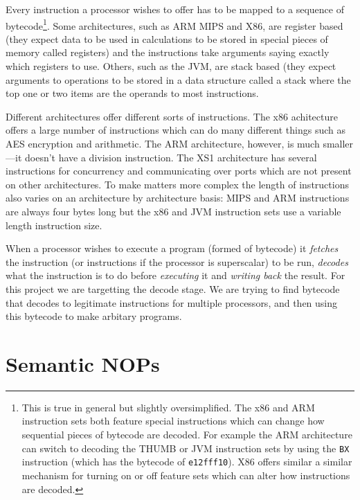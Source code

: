 \documentclass[10pt,]{book}
\begin{document}
Every instruction a processor wishes to offer has to be mapped to a
sequence of bytecode\footnote{This is true in general but slightly
  oversimplified. The x86 and ARM instruction sets both feature special
  instructions which can change how sequential pieces of bytecode are
  decoded. For example the ARM architecture\autocite{Seal:2000vd} can
  switch to decoding the THUMB or JVM instruction sets by using the
  \lstinline!BX! instruction (which has the bytecode of
  \lstinline!e12fff10!). X86\autocite{IntelCorporation:1997ta} offers
  similar a similar mechanism for turning on or off feature sets which
  can alter how instructions are decoded.}. Some architectures, such as
ARM\autocite{Seal:2000vd} MIPS\autocite{MIPSTechnologiesInc:2011ta} and
X86\autocite{IntelCorporation:1997ta}, are register based (they expect
data to be used in calculations to be stored in special pieces of memory
called registers) and the instructions take arguments saying exactly
which registers to use. Others, such as the
JVM\autocite{Lindholm:2012wy}, are stack based (they expect arguments to
operations to be stored in a data structure called a stack where the top
one or two items are the operands to most instructions.

Different architectures offer different sorts of instructions. The x86
achitecture offers a large number of instructions which can do many
different things such as AES encryption and arithmetic\autocite{refx86}.
The ARM architecture\autocite{Seal:2000vd}, however, is much
smaller---it doesn't have a division instruction. The XS1
architecture\autocite{May:ua} has several instructions for concurrency
and communicating over ports which are not present on other
architectures. To make matters more complex the length of instructions
also varies on an architecture by architecture basis: MIPS and ARM
instructions are always four bytes long but the x86 and JVM instruction
sets use a variable length instruction size.

When a processor wishes to execute a program (formed of bytecode) it
\emph{fetches} the instruction (or instructions if the processor is
superscalar) to be run, \emph{decodes} what the instruction is to do
before \emph{executing} it and \emph{writing back} the result. For this
project we are targetting the decode stage. We are trying to find
bytecode that decodes to legitimate instructions for multiple
processors, and then using this bytecode to make arbitary programs.

\section{Semantic NOPs}
\end{document}
